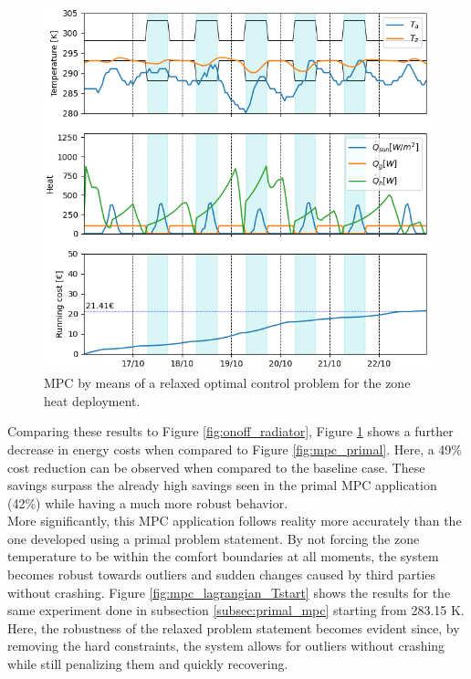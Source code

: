 \begin{figure}[H]
\centering
\includegraphics[scale=0.8]{images/mpc_lagrangian.png}
\caption{MPC by means of a relaxed optimal control problem for the zone heat deployment.}
\label{fig:mpc_lagrangian}
\end{figure}

Comparing these results to Figure \ref{fig:onoff_radiator}, Figure \ref{fig:mpc_lagrangian} shows a further decrease in energy costs when compared to Figure \ref{fig:mpc_primal}. Here, a 49\% cost reduction can be observed when compared to the baseline case. These savings surpass the already high savings seen in the primal MPC application (42\%) while having a much more robust behavior.\\

More significantly, this MPC application follows reality more accurately than the one developed using a primal problem statement. By not forcing the zone temperature to be within the comfort boundaries at all moments, the system becomes robust towards outliers and sudden changes caused by third parties without crashing. Figure \ref{fig:mpc_lagrangian_Tstart} shows the results for the same experiment done in subsection \ref{subsec:primal_mpc} starting from 283.15 K. Here, the robustness of the relaxed problem statement becomes evident since, by removing the hard constraints, the system allows for outliers without crashing while still penalizing them and quickly recovering.

